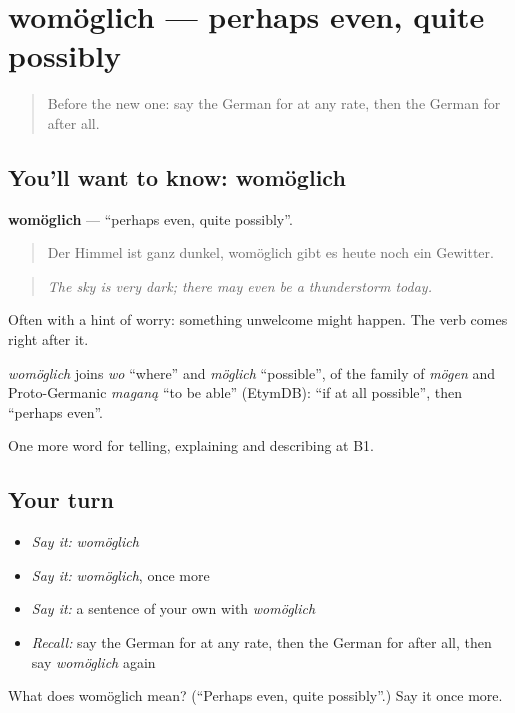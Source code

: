 \section[womöglich]{womöglich — perhaps even, quite possibly}

\label{lesson:GE-C367-womoeglich}



\begin{quote}
Before the new one: say the German for at any rate, then the German for after all.
\end{quote}

\subsection*{You'll want to know: womöglich}
\textbf{womöglich} — \textquotedblleft{}perhaps even, quite possibly\textquotedblright{}.

\begin{quote}
Der Himmel ist ganz dunkel, womöglich gibt es heute noch ein Gewitter.
\end{quote}

\begin{quote}
\emph{The sky is very dark; there may even be a thunderstorm today.}
\end{quote}

Often with a hint of worry: something unwelcome might happen. The verb comes right after it.

\begin{cousinweb}
\emph{womöglich} joins \emph{wo} \textquotedblleft{}where\textquotedblright{} and \emph{möglich} \textquotedblleft{}possible\textquotedblright{}, of the family of \emph{mögen} and Proto-Germanic \emph{maganą} \textquotedblleft{}to be able\textquotedblright{} (EtymDB): \textquotedblleft{}if at all possible\textquotedblright{}, then \textquotedblleft{}perhaps even\textquotedblright{}.
\end{cousinweb}

\begin{grammarlens}[title={What you've built}]
One more word for telling, explaining and describing at B1.
\end{grammarlens}

\subsection*{Your turn}
\begin{itemize}
\raggedright
  \item \emph{Say it:} \emph{womöglich}
  \item \emph{Say it:} \emph{womöglich}, once more
  \item \emph{Say it:} a sentence of your own with \emph{womöglich}
  \item \emph{Recall:} say the German for at any rate, then the German for after all, then say \emph{womöglich} again
\end{itemize}

\begin{tcolorbox}[breakable,colback=teal!4,colframe=teal!35!black,title={Before you move on}]
What does womöglich mean? (\textquotedblleft{}Perhaps even, quite possibly\textquotedblright{}.) Say it once more.
\end{tcolorbox}
